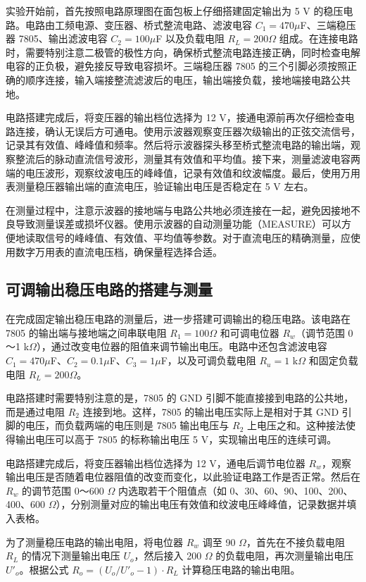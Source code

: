 ﻿\documentclass[12pt,a4paper]{article}
\begin{document}
实验开始前，首先按照电路原理图在面包板上仔细搭建固定输出为 5 V 的稳压电路。电路由工频电源、变压器、桥式整流电路、滤波电容 $C_1 = 470 \mu$F、三端稳压器 7805、输出滤波电容 $C_2 = 100 \mu$F 以及负载电阻 $R_L = 200 \Omega$ 组成。在连接电路时，需要特别注意二极管的极性方向，确保桥式整流电路连接正确，同时检查电解电容的正负极，避免接反导致电容损坏。三端稳压器 7805 的三个引脚必须按照正确的顺序连接，输入端接整流滤波后的电压，输出端接负载，接地端接电路公共地。

电路搭建完成后，将变压器的输出档位选择为 12 V，接通电源前再次仔细检查电路连接，确认无误后方可通电。使用示波器观察变压器次级输出的正弦交流信号，记录其有效值、峰峰值和频率。然后将示波器探头移至桥式整流电路的输出端，观察整流后的脉动直流信号波形，测量其有效值和平均值。接下来，测量滤波电容两端的电压波形，观察纹波电压的峰峰值，记录有效值和纹波幅度。最后，使用万用表测量稳压器输出端的直流电压，验证输出电压是否稳定在 5 V 左右。

在测量过程中，注意示波器的接地端与电路公共地必须连接在一起，避免因接地不良导致测量误差或损坏仪器。使用示波器的自动测量功能（MEASURE）可以方便地读取信号的峰峰值、有效值、平均值等参数。对于直流电压的精确测量，应使用数字万用表的直流电压档，确保量程选择合适。

\subsection{可调输出稳压电路的搭建与测量}

在完成固定输出稳压电路的测量后，进一步搭建可调输出的稳压电路。该电路在 7805 的输出端与接地端之间串联电阻 $R_1 = 100 \Omega$ 和可调电位器 $R_w$（调节范围 0～1 k$\Omega$），通过改变电位器的阻值来调节输出电压。电路中还包含滤波电容 $C_1 = 470 \mu$F、$C_2 = 0.1 \mu$F、$C_3 = 1 \mu$F，以及可调负载电阻 $R_u = 1 \text{ k}\Omega$ 和固定负载电阻 $R_L = 200 \Omega$。

电路搭建时需要特别注意的是，7805 的 GND 引脚不能直接接到电路的公共地，而是通过电阻 $R_2$ 连接到地。这样，7805 的输出电压实际上是相对于其 GND 引脚的电压，而负载两端的电压则是 7805 输出电压与 $R_2$ 上电压之和。这种接法使得输出电压可以高于 7805 的标称输出电压 5 V，实现输出电压的连续可调。

电路搭建完成后，将变压器输出档位选择为 12 V，通电后调节电位器 $R_w$，观察输出电压是否随着电位器阻值的改变而变化，以此验证电路工作是否正常。然后在 $R_w$ 的调节范围 0～600 $\Omega$ 内选取若干个阻值点（如 0、30、60、90、100、200、400、600 $\Omega$），分别测量对应的输出电压有效值和纹波电压峰峰值，记录数据并填入表格。

为了测量稳压电路的输出电阻，将电位器 $R_w$ 调至 90 $\Omega$，首先在不接负载电阻 $R_L$ 的情况下测量输出电压 $U_o$，然后接入 200 $\Omega$ 的负载电阻，再次测量输出电压 $U'_o$。根据公式 $R_o = (U_o / U'_o - 1) \cdot R_L$ 计算稳压电路的输出电阻。
\end{document}
